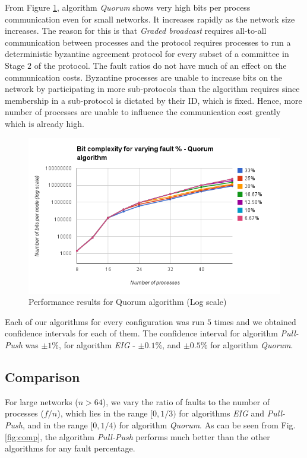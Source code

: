 From Figure \ref{fig:quorum}, algorithm \textit{Quorum} shows very high bits per process communication even for small networks. It increases rapidly as the network size increases. The reason for this is that \textit{Graded broadcast} requires all-to-all communication between processes and the protocol requires processes to run a deterministic byzantine agreement protocol for every subset of a committee in Stage $2$ of the protocol. The fault ratios do not have much of an effect on the communication costs. Byzantine processes are unable to increase bits on the network by participating in more sub-protocols than the algorithm requires since membership in a sub-protocol is dictated by their ID, which is fixed. Hence, more number of processes are unable to influence the communication cost greatly which is already high.  
\begin{figure}[ht]
 \centering
\includegraphics[scale=0.4]{quorum}
\caption{Performance results for Quorum algorithm (Log scale)}
 \label{fig:quorum}
\vspace{-2mm}
\end{figure}

Each of our algorithms for every configuration was run $5$ times and we obtained confidence intervals for each of them. The confidence interval for algorithm \textit{Pull-Push} was $\pm 1\%$, for algorithm \textit{EIG} - $\pm 0.1\%$, and $\pm 0.5\%$ for algorithm \textit{Quorum}.

\subsection{Comparison}
For large networks ($n > 64$), we vary the ratio of faults to the number of processes ($f/n$), which lies in the range $[0, 1/3)$ for algorithms \textit{EIG} and \textit{Pull-Push}, and in the range $[0, 1/4)$ for algorithm \textit{Quorum}.
        As can be seen from Fig. \ref{fig:comp}, the algorithm \textit{Pull-Push} performs much better than the other algorithms for any fault percentage.


